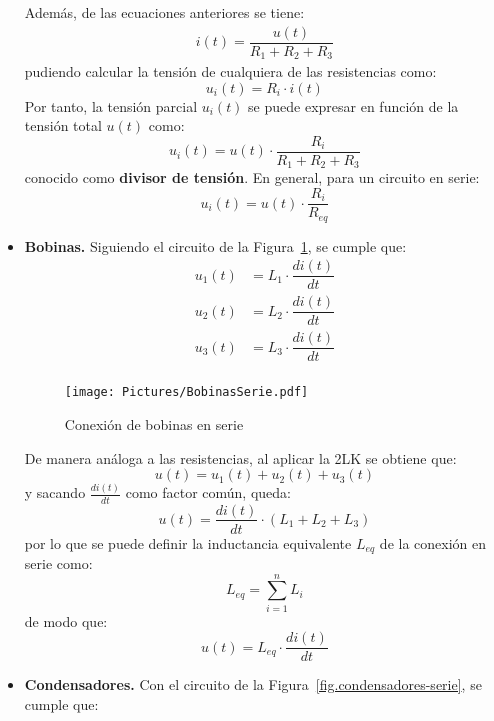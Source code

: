 \documentclass[11pt]{book} %
\numberwithin{dummy}{section}
\theoremstyle{ocrenumbox}
\theoremstyle{blacknumex}
\theoremstyle{blacknumbox}
\theoremstyle{ocrenum}
\begin{document}
\begin{itemize}
		Además, de las ecuaciones anteriores se tiene:
		\begin{align*}
			i(t) = \dfrac{u(t)}{R_1 + R_2 + R_3}
		\end{align*}
		pudiendo calcular la tensión de cualquiera de las resistencias como: 
		\begin{equation*}
			u_i(t) = R_i \cdot i(t)
		\end{equation*}
		Por tanto, la tensión parcial $u_i(t)$ se puede expresar en función de la tensión total $u(t)$ como: 
		\begin{equation*}
			u_i(t) = u(t) \cdot \frac{R_i}{R_1 + R_2 + R_3}
		\end{equation*}
		conocido como \textbf{divisor de tensión}. En general, para un circuito en serie:
		\begin{equation}
			\boxed{u_i(t) = u(t) \cdot \frac{R_i}{R_{eq}}}
		\end{equation}
		\item \textbf{Bobinas.} Siguiendo el circuito de la Figura~\ref{fig.bobinas-serie}, se cumple que:
		\begin{align*}
			u_1(t) &= L_1 \cdot \dfrac{di(t)}{dt}\\
			u_2(t) &= L_2 \cdot \dfrac{di(t)}{dt}\\
			u_3(t) &= L_3 \cdot \dfrac{di(t)}{dt}\\
		\end{align*}
		\begin{figure}[htbp]
			\centering
			\texttt{[image: Pictures/BobinasSerie.pdf]}
			\caption{Conexión de bobinas en serie}
			\label{fig.bobinas-serie}
		\end{figure}
		De manera análoga a las resistencias, al aplicar la 2LK se obtiene que: 
		\begin{equation*}
			u(t) = u_1(t) + u_2(t) + u_3(t)
		\end{equation*}
		y sacando $\frac{di(t)}{dt}$ como factor común, queda:
		\begin{equation*}
			u(t) = \dfrac{di(t)}{dt} \cdot (L_1 + L_2 + L_3)
		\end{equation*}
		por lo que se puede definir la inductancia equivalente $L_{eq}$ de la conexión en serie como:
		\begin{equation}
			\boxed{L_{eq} = \sum_{i = 1}^n L_i}
		\end{equation}
		de modo que:
		\begin{equation*}
			u(t) = L_{eq} \cdot \dfrac{di(t)}{dt}
		\end{equation*}
		\item \textbf{Condensadores.} Con el circuito de la Figura~\ref{fig.condensadores-serie}, se cumple que:

\end{itemize}
\end{document}
